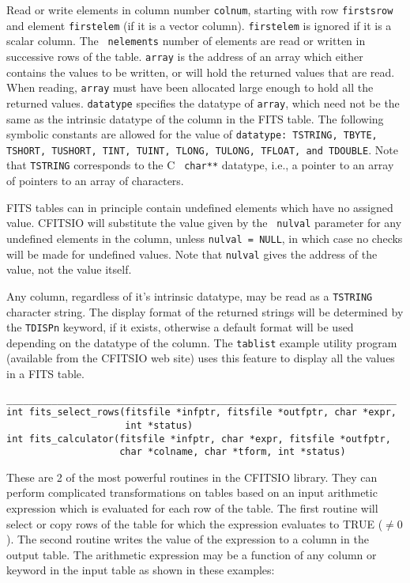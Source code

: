 \documentclass[11pt]{article}
\begin{document}
Read or write elements in column number {\tt colnum}, starting with row
{\tt firstsrow} and element {\tt firstelem} (if it is a vector
column).  {\tt firstelem} is ignored if it is a scalar column. The {\tt
nelements} number of elements are read or written in successive rows of
the table.  {\tt array} is the address of an array which either
contains the  values to be written, or will hold the returned values
that are read.  When reading, {\tt array} must have been allocated
large enough to hold all the returned values. {\tt datatype} specifies
the datatype of {\tt array}, which need not be the same as the
intrinsic datatype of the column in the FITS table.   The following
symbolic constants are allowed for the value of {\tt datatype:
TSTRING, TBYTE, TSHORT, TUSHORT, TINT, TUINT, TLONG, TULONG, TFLOAT,
and TDOUBLE}.  Note that {\tt TSTRING} corresponds to the C {\tt
char**} datatype, i.e., a pointer to an array of pointers to an array
of characters.

FITS tables can in principle contain undefined elements which have no
assigned value.  CFITSIO will substitute the value given by the {\tt
nulval} parameter for  any undefined elements in the column, unless
{\tt nulval = NULL}, in which case no checks will be made for undefined
values. Note that {\tt nulval} gives the address of the value, not the
value itself.

Any column, regardless of it's intrinsic datatype, may be read as a
{\tt TSTRING} character string. The display format of the returned
strings will be determined by the {\tt TDISPn} keyword, if it exists,
otherwise a default format will be used depending on the datatype of
the column.  The {\tt tablist} example utility program (available from
the CFITSIO web site) uses this feature to display all the values in a
FITS table.

\begin{verbatim}
_____________________________________________________________________
int fits_select_rows(fitsfile *infptr, fitsfile *outfptr, char *expr,
                     int *status)
int fits_calculator(fitsfile *infptr, char *expr, fitsfile *outfptr,
                    char *colname, char *tform, int *status) 
\end{verbatim}

These are 2 of the most powerful routines in the CFITSIO library.  They
can perform complicated transformations on tables based on an input
arithmetic expression which is evaluated for each row of the table.
The first routine will select or copy rows of the table for which the
expression evaluates to TRUE ($ \neq 0$).  The second routine writes
the value of the expression to a column in the output table.  The
arithmetic expression may be a function of any column or keyword in the
input table as shown in these examples:
\end{document}
